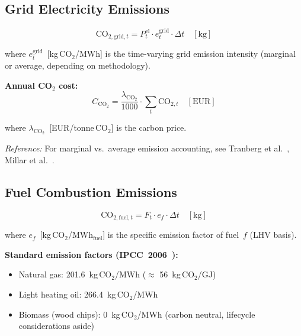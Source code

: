 \documentclass[a4paper,12pt]{article}
\begin{document}
\subsection{Grid Electricity Emissions}

\begin{equation}
  \mathrm{CO}_{2,\text{grid},t}
  = P^{\text{el}}_{t} \cdot e^{\text{grid}}_{t} \cdot \Delta t
  \quad [\text{kg}]
  \tag{CO2-1}
  \label{eq:co2-1}
\end{equation}

where $e^{\text{grid}}_{t}$~[kg\,CO$_2$/MWh] is the time-varying grid emission intensity
(marginal or average, depending on methodology).

\noindent\textbf{Annual CO$_2$ cost:}
\begin{equation}
  C_{\text{CO}_2}
  = \frac{\lambda_{\text{CO}_2}}{1000}
    \cdot \sum_{t} \mathrm{CO}_{2,t}
  \quad [\text{EUR}]
  \label{eq:co2-cost}
\end{equation}

where $\lambda_{\text{CO}_2}$~[EUR/tonne\,CO$_2$] is the carbon price.

\noindent\textit{Reference:} For marginal vs.\ average emission accounting, see Tranberg et
al.~\cite{Tranberg2019}, Millar et al.~\cite{Millar2021}.

\subsection{Fuel Combustion Emissions}

\begin{equation}
  \mathrm{CO}_{2,\text{fuel},t}
  = F_{t} \cdot e_{f} \cdot \Delta t
  \quad [\text{kg}]
  \tag{CO2-2}
  \label{eq:co2-2}
\end{equation}

where $e_{f}$~[kg\,CO$_2$/MWh$_{\text{fuel}}$] is the specific emission factor of fuel~$f$
(LHV basis).

\noindent\textbf{Standard emission factors (IPCC~2006~\cite{IPCC2006}):}
\begin{itemize}
  \item Natural gas: 201.6~kg\,CO$_2$/MWh ($\approx$ 56~kg\,CO$_2$/GJ)
  \item Light heating oil: 266.4~kg\,CO$_2$/MWh
  \item Biomass (wood chips): 0~kg\,CO$_2$/MWh (carbon neutral, lifecycle considerations aside)
\end{itemize}
\end{document}
